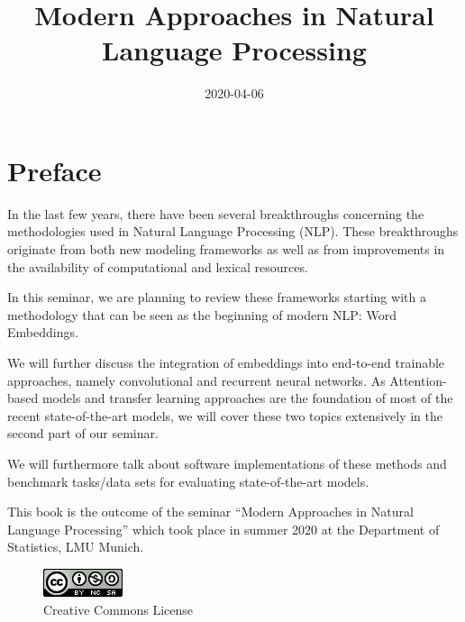 \documentclass[]{krantz}
\title{Modern Approaches in Natural Language Processing}
\author{}
\date{\vspace{-2.5em}2020-04-06}
\begin{document}
\maketitle


\thispagestyle{empty}

\begin{center}
\end{center}

\setlength{\abovedisplayskip}{-5pt}
\setlength{\abovedisplayshortskip}{-5pt}

{
\hypersetup{linkcolor=black}
\setcounter{tocdepth}{0}
\tableofcontents
}
\chapter*{Preface}\label{preface}


In the last few years, there have been several breakthroughs concerning
the methodologies used in Natural Language Processing (NLP). These
breakthroughs originate from both new modeling frameworks as well as
from improvements in the availability of computational and lexical
resources.

In this seminar, we are planning to review these frameworks starting
with a methodology that can be seen as the beginning of modern NLP: Word
Embeddings.

We will further discuss the integration of embeddings into end-to-end
trainable approaches, namely convolutional and recurrent neural
networks. As Attention-based models and transfer learning approaches are
the foundation of most of the recent state-of-the-art models, we will
cover these two topics extensively in the second part of our seminar.

We will furthermore talk about software implementations of these methods
and benchmark tasks/data sets for evaluating state-of-the-art models.

This book is the outcome of the seminar ``Modern Approaches in Natural
Language Processing'' which took place in summer 2020 at the Department
of Statistics, LMU Munich.

\begin{figure}
\centering
\includegraphics{figures/by-nc-sa.png}
\caption{Creative Commons License}
\end{figure}
\end{document}
